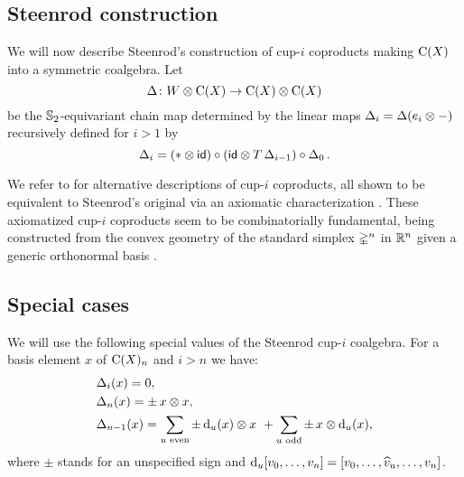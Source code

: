 %	

\subsection{Steenrod construction} \label{ss:cup-i}

We will now describe Steenrod's construction of cup-$i$ coproducts \cite[p.293]{steenrod1947products} making $\operatorname{C}(X)$ into a symmetric coalgebra.
Let
\[
\Delta \colon W \otimes \operatorname{C}(X) \to \operatorname{C}(X) \otimes \operatorname{C}(X)
\]
be the $\mathbb{S}_2$-equivariant chain map determined by the linear maps $\Delta_i = \Delta(e_i \otimes -)$ recursively defined for $i > 1$ by
\begin{equation*} \label{e:cup-i coproducts}
	\operatorname{\Delta}_i =
	(\ast \otimes \mathsf{id}) \circ (\mathsf{id} \otimes T\operatorname{\Delta}_{i-1}) \circ \operatorname{\Delta}_0.
\end{equation*}

We refer to \cite{real1996computability, gonzalez-diaz1999steenrod, mcclure2003multivariable, medina2021fast_sq} for alternative descriptions of cup-$i$ coproducts, all shown to be equivalent to Steenrod's original via an axiomatic characterization \cite{medina2022axiomatic}.
These axiomatized cup-$i$ coproducts seem to be combinatorially fundamental, being constructed from the convex geometry of the standard simplex $\mathbb{\Delta}^n$ in $\mathbb{R}^n$ given a generic orthonormal basis \cite{medina2022fib_poly}.

\subsection{Special cases}

We will use the following special values of the Steenrod cup-$i$ coalgebra.
For a basis element $x$ of $\operatorname{C}(X)_n$ and $i > n$ we have:
\begin{align}
	&\Delta_i(x) = 0, \\
	&\Delta_n(x) = \pm \, x \otimes x, \\
	&\Delta_{n-1}(x) =
	\sum_{u \text{ even}} \pm \operatorname{d}_u(x) \otimes x \ +
	\sum_{u \text{ odd}} \pm \, x \otimes \operatorname{d}_u(x),
\end{align}
where $\pm$ stands for an unspecified sign and $\operatorname{d}_u [v_0,\dots,v_n] = [v_0,\dots,\widehat{v}_u,\dots,v_n]$.

